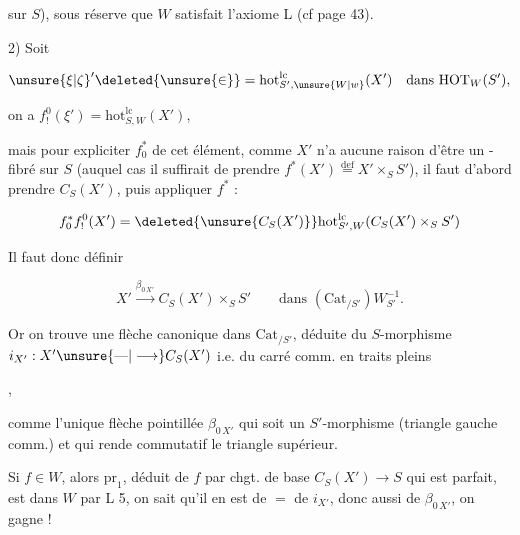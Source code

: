 
sur $S$), sous réserve que $W$ satisfait l'axiome L  (cf page 43).

2) Soit

\[
 \unsure{\xi|\zeta}'\deleted{\unsure{\in}}=\mathrm{hot}_{S',\unsure{W|w}}^{\mathrm{lc}}(X')\quad\text{dans }\mathrm{HOT}_W(S'),
\]

on a $f_!^0(\xi')=\mathrm{hot}_{S,W}^{\mathrm{lc}}(X')$,

mais pour expliciter $f_0^*$ \deleted{\unsure{$\xi$}} de cet élément, comme $X'$ n'a aucune raison d'être  un -fibré sur $S$ (auquel cas il suffirait de prendre $f^*(X')\overset{\mathrm{def}}=X'\times_S S'$), il faut d'abord prendre $C_S(X')$, puis appliquer $f^*$ :

\[
 f_0^*f_!^0(X')=\deleted{\unsure{C_S(X')}}\mathrm{hot}_{S',W}^{\mathrm{lc}}(C_S(X')\times_S S')
\]

Il faut donc définir

\[
 X'\xrightarrow{\beta_{0\,X'}} C_S(X')\times_S S'
 \qquad\text{dans }(\mathrm{Cat}_{/S'})W_{S'}^{-1}.
\]

Or on trouve une flèche canonique dans $\mathrm{Cat}_{/S'}$, déduite du $S$-morphisme $i_{X'}:X'\unsure{\text{---}|\longrightarrow} C_S(X')$ i.e. du carré comm. en traits pleins


,

comme l'unique flèche pointillée $\beta_{0\,X'}$ qui soit un $S'$-morphisme (triangle gauche comm.) et qui rende commutatif le triangle supérieur.

Si $f\in W$, alors $\mathrm{pr}_1$, déduit de $f$ par chgt. de base $C_S(X')\longrightarrow S$ qui est parfait, est dans $W$ par L 5, on sait qu'il en est de $=$ de $i_{X'}$, donc aussi de $\beta_{0\,X'}$, on gagne !

